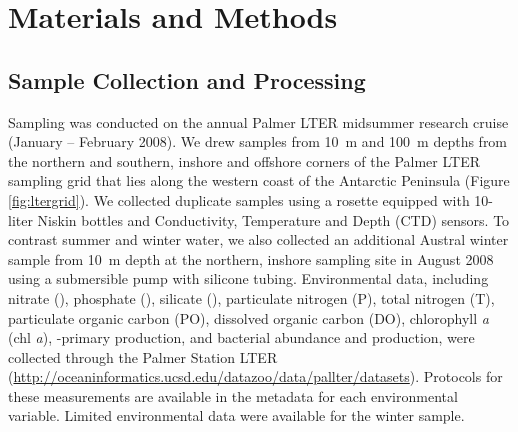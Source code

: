 \section{Materials and Methods}\label{sc:materials-and-methods}

\subsection{Sample Collection and Processing}\label{ssc:sample-collection-and-processing}

Sampling was conducted on the annual Palmer LTER midsummer research cruise (January -- February 2008). We drew samples from \SI{10}{\m} and \SI{100}{\m} depths from the northern and southern, inshore and offshore corners of the Palmer LTER sampling grid that lies along the western coast of the Antarctic Peninsula (Figure \ref{fig:ltergrid}). We collected duplicate samples using a rosette equipped with 10-liter Niskin bottles and Conductivity, Temperature and Depth (CTD) sensors. To contrast summer and winter water, we also collected an additional Austral winter sample from \SI{10}{\m} depth at the northern, inshore sampling site in August 2008 using a submersible pump with silicone tubing. Environmental data, including nitrate (), phosphate (), silicate (), particulate nitrogen (P), total nitrogen (T), particulate organic carbon (PO), dissolved organic carbon (DO), chlorophyll \textit{a} (chl \textit{a}), -primary production, and bacterial abundance and production, were collected through the Palmer Station LTER (\url{http://oceaninformatics.ucsd.edu/datazoo/data/pallter/datasets}). Protocols for these measurements are available in the metadata for each environmental variable. Limited environmental data were available for the winter sample.

